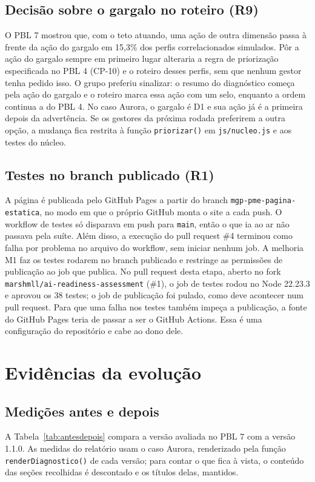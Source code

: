 \documentclass[11pt,a4paper]{article}
\begin{document}
\subsection{Decisão sobre o gargalo no roteiro (R9)}
O PBL 7 mostrou que, com o teto atuando, uma ação de outra dimensão passa à frente da ação do gargalo em 15,3\% dos
perfis correlacionados simulados. Pôr a ação do gargalo sempre em primeiro lugar alteraria a regra de priorização
especificada no PBL 4 (CP-10) e o roteiro desses perfis, sem que nenhum gestor tenha pedido isso. O grupo preferiu
sinalizar: o resumo do diagnóstico começa pela ação do gargalo e o roteiro marca essa ação com um selo, enquanto a
ordem continua a do PBL 4. No caso Aurora, o gargalo é D1 e sua ação já é a primeira depois da advertência. Se
os gestores da próxima rodada preferirem a outra opção, a mudança fica restrita à função \texttt{priorizar()} em
\texttt{js/nucleo.js} e aos testes do núcleo.

\subsection{Testes no branch publicado (R1)}
A página é publicada pelo GitHub Pages a partir do branch \texttt{mgp-pme-pagina-estatica}, no modo em que o próprio
GitHub monta o site a cada push. O workflow de testes só disparava em push para \texttt{main}, então o que ia ao ar não
passava pela suíte. Além disso, a execução do pull request \#4 terminou como falha por problema no arquivo do workflow,
sem iniciar nenhum job. A melhoria M1 faz os testes rodarem no branch publicado e restringe as permissões de publicação
ao job que publica. No pull request desta etapa, aberto no fork \texttt{marshmll/ai-readiness-assessment} (\#1), o job de testes rodou no Node 22.23.3 e aprovou os 38 testes; o job de publicação foi pulado, como deve acontecer num pull request. Para que uma falha nos testes também impeça a publicação, a fonte do GitHub Pages teria de
passar a ser o GitHub Actions. Essa é uma configuração do repositório e cabe ao dono dele.

\section{Evidências da evolução}\label{sec:evidencias}
\subsection{Medições antes e depois}
A Tabela~\ref{tab:antesdepois} compara a versão avaliada no PBL 7 com a versão 1.1.0. As medidas do relatório usam o
caso Aurora, renderizado pela função \texttt{renderDiagnostico()} de cada versão; para contar o que fica à vista, o
conteúdo das seções recolhidas é descontado e os títulos delas, mantidos.
\end{document}
